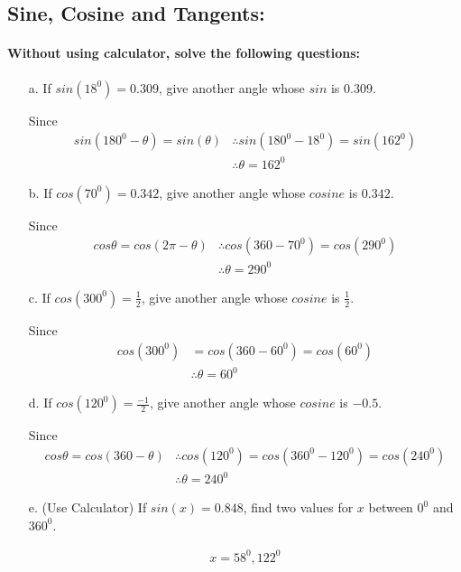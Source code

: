 \documentclass{article}
\begin{document}
\subsection{Sine, Cosine and Tangents:}
\paragraph{Without using calculator, solve the following questions:}
\begin{enumerate}
        \item[a. ] If $sin(18^{0})= 0.309$, give another angle whose $sin$ is $0.309$.
        
        Since
        \[
        \begin{aligned}
          sin(180^0-\theta) = sin(\theta)
          &\therefore sin(180^{0}-18^{0}) = sin(162^{0}) \\
          &\therefore \theta = 162^{0}
        \end{aligned}
        \]

        \item[b. ] If $cos(70^{0})= 0.342$, give another angle whose $cosine$ is $0.342$.

        Since
        \[
        \begin{aligned}
          cos\theta = cos(2\pi - \theta)
                    &\therefore cos(360-70^{0}) = cos(290^{0}) \\
                    &\therefore \theta = 290^{0}
        \end{aligned}
        \]

        \item[c. ] If $cos(300^{0})= \frac{1}{2}$, give another angle whose $cosine$ is $\frac{1}{2}$.

        Since
        \[
        \begin{aligned}
          cos(300^{0}) &= cos(360-60^{0}) = cos(60^{0}) \\
                       &\therefore \theta = 60^{0}
        \end{aligned}
        \]
        \item[d. ] If $cos(120^{0})= \frac{-1}{2}$, give another angle whose $cosine$ is $-0.5$.

        Since
        \[
        \begin{aligned}
          cos\theta = cos(360-\theta)
          &\therefore cos(120^{0}) = cos(360^{0} - 120^{0}) = cos(240^{0}) \\
          &\therefore \theta = 240^{0}
        \end{aligned}
        \]
        \item[e. ] (Use Calculator) If $sin(x)= 0.848$, find two values for $x$ between $0^{0}$ and $360^{0}$.

        \[
        \begin{aligned}
          x = 58^{0}, 122^{0}
        \end{aligned}
        \]
\end{enumerate}
\end{document}
